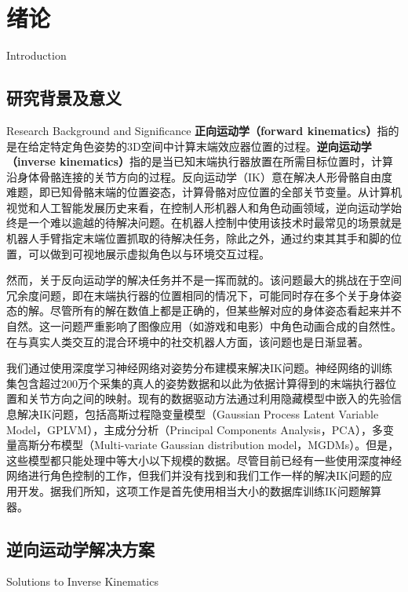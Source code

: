 \chapter{绪论}{Introduction}

\section{研究背景及意义}{Research Background and Significance}
\textbf{正向运动学（forward kinematics）}指的是在给定特定角色姿势的3D空间中计算末端效应器位置的过程。\textbf{逆向运动学（inverse kinematics）}指的是当已知末端执行器放置在所需目标位置时，计算沿身体骨骼连接的关节方向的过程。反向运动学（IK）意在解决人形骨骼自由度难题，即已知骨骼末端的位置姿态，计算骨骼对应位置的全部关节变量。从计算机视觉和人工智能发展历史来看，在控制人形机器人和角色动画领域，逆向运动学始终是一个难以逾越的待解决问题。在机器人控制中使用该技术时最常见的场景就是机器人手臂指定末端位置抓取的待解决任务，除此之外，通过约束其其手和脚的位置，可以做到可视地展示虚拟角色以与环境交互过程。

然而，关于反向运动学的解决任务并不是一挥而就的。该问题最大的挑战在于空间冗余度\cite{reinhart2011neural}问题，即在末端执行器的位置相同的情况下，可能同时存在多个关于身体姿态的解。尽管所有的解在数值上都是正确的，但某些解对应的身体姿态看起来并不自然。这一问题严重影响了图像应用（如游戏和电影）中角色动画合成的自然性。在与真实人类交互的混合环境中的社交机器人方面，该问题也是日渐显著。

我们通过使用深度学习神经网络对姿势分布建模来解决IK问题。神经网络的训练集包含超过200万个采集的真人的姿势数据和以此为依据计算得到的末端执行器位置和关节方向之间的映射。现有的数据驱动方法通过利用隐藏模型中嵌入的先验信息解决IK问题，包括高斯过程隐变量模型（Gaussian Process Latent Variable Model，GPLVM）\cite{grochow2004Style}，主成分分析（Principal Components Analysis，PCA）\cite{tournier2009motion}，多变量高斯分布模型（Multi-variate Gaussian distribution model，MGDMs）\cite{huang2017multi}。但是，这些模型都只能处理中等大小以下规模的数据\cite{koker2004study,daya2010applying,feng2012inverse}。尽管目前已经有一些使用深度神经网络进行角色控制的工作\cite{levine2014learning,holden2016deep,holden2017phase}，但我们并没有找到和我们工作一样的解决IK问题的应用开发。据我们所知，这项工作是首先使用相当大小的数据库训练IK问题解算器。
\section{逆向运动学解决方案}{Solutions to Inverse Kinematics}

